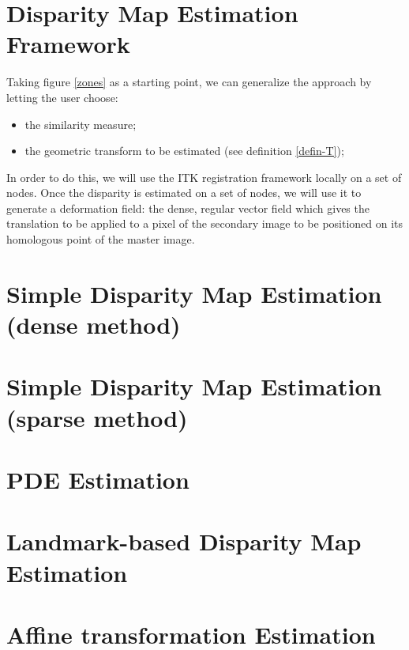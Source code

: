 

\section{Disparity Map Estimation Framework}
\label{sec:DisparityMapEstimationFramework}
Taking figure \ref{zones} as a starting point, we can generalize the
approach by letting the user choose:
\begin{itemize}
  \item the similarity measure;
  \item the geometric transform to be estimated (see definition
  \ref{defin-T});
\end{itemize}

In order to do this, we will use the ITK registration framework
locally on a set of nodes. Once the disparity is estimated on a set of
nodes, we will use it to generate a deformation field: the dense,
regular vector field which gives the translation to be applied to
a pixel of the secondary image to be positioned on its homologous
point of the master image.

\section{Simple Disparity Map Estimation (dense method)}
\label{sec:SimpleDisparityMapEstimationDense}


\section{Simple Disparity Map Estimation (sparse method)}
\label{sec:SimpleDisparityMapEstimationSparse}


\section{PDE Estimation}
\label{sec:PDEEstimation}


\section{Landmark-based Disparity Map Estimation}
\label{sec:Landmark-basedDisparityMapEstimation}


\section{Affine transformation Estimation}
\label{sec:EstimateAffineTransformationExample}




  
